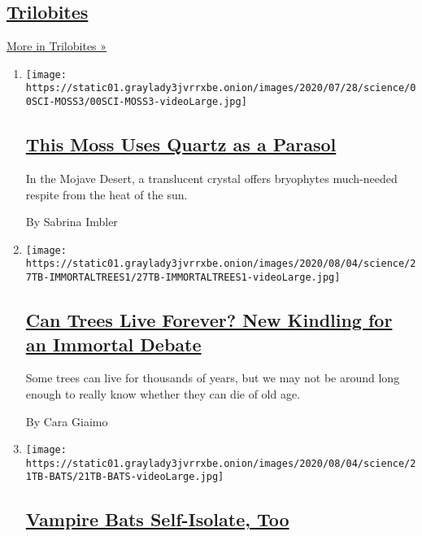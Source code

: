 \hypertarget{trilobites-3}{%
\subsection{\texorpdfstring{\href{/column/trilobites}{Trilobites}}{Trilobites}}\label{trilobites-3}}

\href{/column/trilobites}{More in Trilobites »}

\begin{enumerate}
\def\labelenumi{\arabic{enumi}.}
\item
  \texttt{[image: https://static01.graylady3jvrrxbe.onion/images/2020/07/28/science/00SCI-MOSS3/00SCI-MOSS3-videoLarge.jpg]}

  \hypertarget{this-moss-uses-quartz-as-a-parasol}{%
  \subsection{\texorpdfstring{\href{/2020/07/29/science/moss-quartz-biology-syntrichia.html}{This
  Moss Uses Quartz as a
  Parasol}}{This Moss Uses Quartz as a Parasol}}\label{this-moss-uses-quartz-as-a-parasol}}

  In the Mojave Desert, a translucent crystal offers bryophytes
  much-needed respite from the heat of the sun.

  By Sabrina Imbler
\item
  \texttt{[image: https://static01.graylady3jvrrxbe.onion/images/2020/08/04/science/27TB-IMMORTALTREES1/27TB-IMMORTALTREES1-videoLarge.jpg]}

  \hypertarget{can-trees-live-forever-new-kindling-for-an-immortal-debate}{%
  \subsection{\texorpdfstring{\href{/2020/07/27/science/trees-immortality.html}{Can
  Trees Live Forever? New Kindling for an Immortal
  Debate}}{Can Trees Live Forever? New Kindling for an Immortal Debate}}\label{can-trees-live-forever-new-kindling-for-an-immortal-debate}}

  Some trees can live for thousands of years, but we may not be around
  long enough to really know whether they can die of old age.

  By Cara Giaimo
\item
  \texttt{[image: https://static01.graylady3jvrrxbe.onion/images/2020/08/04/science/21TB-BATS/21TB-BATS-videoLarge.jpg]}

  \hypertarget{vampire-bats-self-isolate-too}{%
  \subsection{\texorpdfstring{\href{/2020/07/22/science/vampire-bats-viruses.html}{Vampire
  Bats Self-Isolate,
  Too}}{Vampire Bats Self-Isolate, Too}}\label{vampire-bats-self-isolate-too}}


\end{enumerate}

